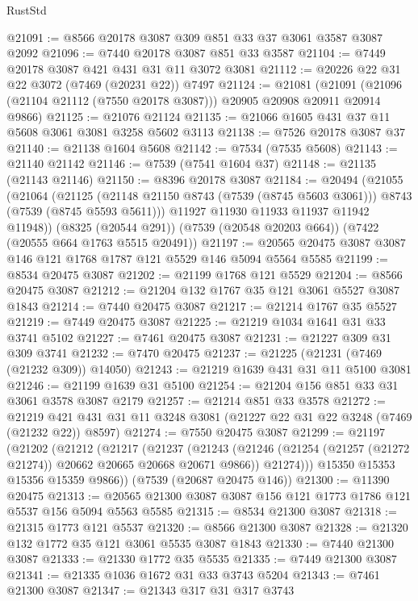 \begin{lexlean}{RustStd}
\begin{coremodule}
@21091 := @8566 @20178 @3087 @309 @851 @33 @37 @3061 @3587 @3087 @2092
@21096 := @7440 @20178 @3087 @851 @33 @3587
@21104 := @7449 @20178 @3087 @421 @431 @31 @11 @3072 @3081
@21112 := @20226 @22 @31 @22 @3072 (@7469 (@20231 @22)) @7497
@21124 := @21081
    (@21091 (@21096 (@21104 @21112 (@7550 @20178 @3087))) @20905 @20908 @20911 @20914 @9866)
@21125 := @21076 @21124
@21135 := @21066 @1605 @431 @37 @11 @5608 @3061 @3081 @3258 @5602 @3113
@21138 := @7526 @20178 @3087 @37
@21140 := @21138 @1604 @5608
@21142 := @7534 (@7535 @5608)
@21143 := @21140 @21142
@21146 := @7539 (@7541 @1604 @37)
@21148 := @21135 (@21143 @21146)
@21150 := @8396 @20178 @3087
@21184 := @20494
    (@21055
      (@21064
        (@21125 (@21148 @21150 @8743 (@7539 (@8745 @5603 @3061))) @8743 (@7539 (@8745 @5593 @5611)))
        @11927
        @11930
        @11933
        @11937
        @11942
        @11948))
    (@8325 (@20544 @291))
    (@7539 (@20548 @20203 @664))
    (@7422 (@20555 @664 @1763 @5515 @20491))
@21197 := @20565 @20475 @3087 @3087 @146 @121 @1768 @1787 @121 @5529 @146 @5094 @5564 @5585
@21199 := @8534 @20475 @3087
@21202 := @21199 @1768 @121 @5529
@21204 := @8566 @20475 @3087
@21212 := @21204 @132 @1767 @35 @121 @3061 @5527 @3087 @1843
@21214 := @7440 @20475 @3087
@21217 := @21214 @1767 @35 @5527
@21219 := @7449 @20475 @3087
@21225 := @21219 @1034 @1641 @31 @33 @3741 @5102
@21227 := @7461 @20475 @3087
@21231 := @21227 @309 @31 @309 @3741
@21232 := @7470 @20475
@21237 := @21225 (@21231 (@7469 (@21232 @309)) @14050)
@21243 := @21219 @1639 @431 @31 @11 @5100 @3081
@21246 := @21199 @1639 @31 @5100
@21254 := @21204 @156 @851 @33 @31 @3061 @3578 @3087 @2179
@21257 := @21214 @851 @33 @3578
@21272 := @21219 @421 @431 @31 @11 @3248 @3081 (@21227 @22 @31 @22 @3248 (@7469 (@21232 @22)) @8597)
@21274 := @7550 @20475 @3087
@21299 := @21197
    (@21202
      (@21212
        (@21217
          (@21237
            (@21243
              (@21246 (@21254 (@21257 (@21272 @21274)) @20662 @20665 @20668 @20671 @9866))
              @21274)))
        @15350
        @15353
        @15356
        @15359
        @9866))
    (@7539 (@20687 @20475 @146))
@21300 := @11390 @20475
@21313 := @20565 @21300 @3087 @3087 @156 @121 @1773 @1786 @121 @5537 @156 @5094 @5563 @5585
@21315 := @8534 @21300 @3087
@21318 := @21315 @1773 @121 @5537
@21320 := @8566 @21300 @3087
@21328 := @21320 @132 @1772 @35 @121 @3061 @5535 @3087 @1843
@21330 := @7440 @21300 @3087
@21333 := @21330 @1772 @35 @5535
@21335 := @7449 @21300 @3087
@21341 := @21335 @1036 @1672 @31 @33 @3743 @5204
@21343 := @7461 @21300 @3087
@21347 := @21343 @317 @31 @317 @3743

\end{coremodule}
\end{lexlean}
